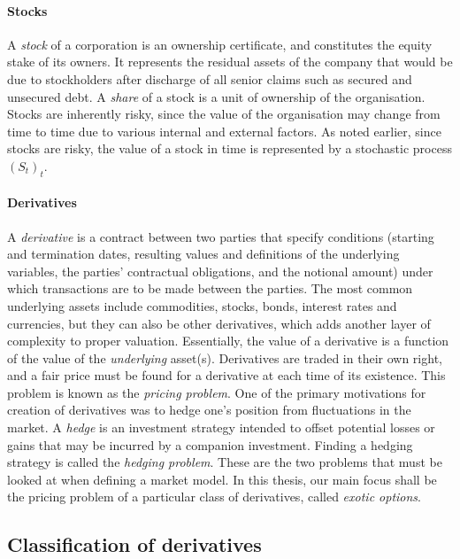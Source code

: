 \paragraph{Stocks}
A \emph{stock} of a corporation is an ownership certificate, and constitutes the equity stake of its owners. It represents the residual assets of the company that would be due to stockholders after discharge of all senior claims such as secured and unsecured debt. A \emph{share} of a stock is a unit of ownership of the organisation. Stocks are inherently risky, since the value of the organisation may change from time to time due to various internal and external factors. As noted earlier, since stocks are risky, the value of a stock in time is represented by a stochastic process $ (S_t)_t $.


\paragraph{Derivatives}
A \emph{derivative} is a contract between two parties that specify conditions (starting and termination dates, resulting values and definitions of the underlying variables, the parties' contractual obligations, and the notional amount) under which transactions are to be made between the parties. The most common underlying assets include commodities, stocks, bonds, interest rates and currencies, but they can also be other derivatives, which adds another layer of complexity to proper valuation. Essentially, the value of a derivative is a function of the value of the \emph{underlying} asset(s). Derivatives are traded in their own right, and a fair price must be found for a derivative at each time of its existence. This problem is known as the \emph{pricing problem}. One of the primary motivations for creation of derivatives was to hedge one's position from fluctuations in the market. A \emph{hedge} is an investment strategy intended to offset potential losses or gains that may be incurred by a companion investment. Finding a hedging strategy is called the \emph{hedging problem}. These are the two problems that must be looked at when defining a market model. In this thesis, our main focus shall be the pricing problem of a particular class of derivatives, called \emph{exotic options}.


\subsection{Classification of derivatives}
\label{subsec:intro-derivative-classification}

